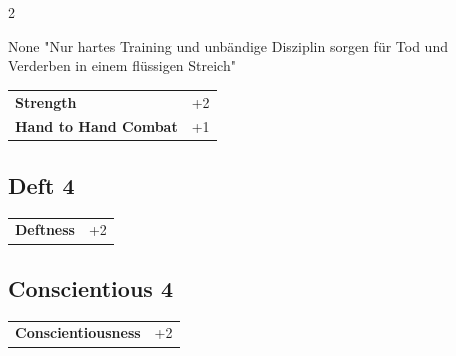 \begin{multicols}{2}
\begin{tcolorbox}
\begin{pquote}{None}
"Nur hartes Training und unbändige Disziplin sorgen für Tod und Verderben in einem flüssigen Streich"
\end{pquote}

\vspace{3mm}

\begin{tabular}{@{}ll@{}}
    \textbf{Strength} & +2\\
    \textbf{Hand to Hand Combat} & +1\\
\end{tabular}


\end{tcolorbox}

\begin{tcolorbox}
    \subsection*{Deft \hfill \small{4 }}
    \tcblower




\begin{tabular}{@{}ll@{}}
    \textbf{Deftness} & +2\\
\end{tabular}


\end{tcolorbox}

\begin{tcolorbox}
    \subsection*{Conscientious \hfill \small{4 }}
    \tcblower




\begin{tabular}{@{}ll@{}}
    \textbf{Conscientiousness} & +2\\
\end{tabular}



\end{tcolorbox}
\end{multicols}
